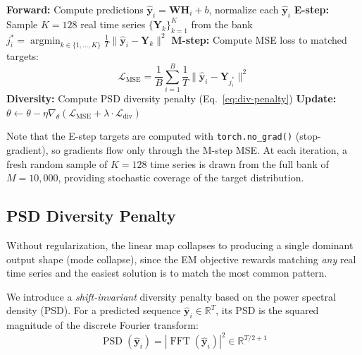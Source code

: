 \documentclass[11pt,a4paper]{article}
\newcommand{\R}{\mathbb{R}}
\newcommand{\bW}{\mathbf{W}}
\newcommand{\bY}{\mathbf{Y}}
\newcommand{\byhat}{\hat{\mathbf{y}}}
\DeclareMathOperator*{\argmin}{argmin}
\DeclareMathOperator{\FFT}{FFT}
\DeclareMathOperator{\PSD}{PSD}
\begin{document}
\begin{algorithm}[H]
\caption{EM-Style Training with Diversity Penalty}
\begin{algorithmic}[1]
        \State \textbf{Forward:} Compute predictions $\byhat_i = \bW \mathbf{H}_i + b$, normalize each $\byhat_i$
        \State \textbf{E-step:} Sample $K = 128$ real time series $\{\bY_k\}_{k=1}^K$ from the bank
        \For{each prediction $\byhat_i$}
            \State $j_i^* = \argmin_{k \in \{1,\ldots,K\}} \frac{1}{T}\|\byhat_i - \bY_k\|^2$
        \EndFor
        \State \textbf{M-step:} Compute MSE loss to matched targets:
        \begin{equation*}
            \mathcal{L}_{\text{MSE}} = \frac{1}{B}\sum_{i=1}^B \frac{1}{T}\|\byhat_i - \bY_{j_i^*}\|^2
        \end{equation*}
        \State \textbf{Diversity:} Compute PSD diversity penalty (Eq.~\ref{eq:div-penalty})
        \State \textbf{Update:} $\theta \leftarrow \theta - \eta \nabla_\theta \left(\mathcal{L}_{\text{MSE}} + \lambda \cdot \mathcal{L}_{\text{div}}\right)$
    \EndFor
\EndFor
\end{algorithmic}
\end{algorithm}

Note that the E-step targets are computed with \texttt{torch.no\_grad()} (stop-gradient), so gradients flow only through the M-step MSE.
At each iteration, a fresh random sample of $K=128$ time series is drawn from the full bank of $M = 10{,}000$, providing stochastic coverage of the target distribution.

\subsection{PSD Diversity Penalty}\label{sec:div-penalty}

Without regularization, the linear map collapses to producing a single dominant output shape (mode collapse), since the EM objective rewards matching \emph{any} real time series and the easiest solution is to match the most common pattern.

We introduce a \emph{shift-invariant} diversity penalty based on the power spectral density (PSD).
For a predicted sequence $\byhat_i \in \R^T$, its PSD is the squared magnitude of the discrete Fourier transform:
\begin{equation}
    \PSD(\byhat_i) = |\FFT(\byhat_i)|^2 \in \R^{T/2+1}
\end{equation}
\end{document}
